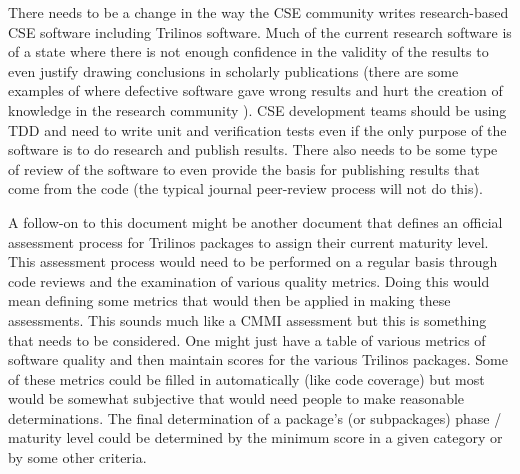 \documentclass[11pt]{SANDreport}
\begin{document}
There needs to be a change in the way the CSE community writes
research-based CSE software including Trilinos software.  Much of the
current research software is of a state where there is not enough
confidence in the validity of the results to even justify drawing
conclusions in scholarly publications (there are some examples of
where defective software gave wrong results and hurt the creation of
knowledge in the research community
{}\cite{ScientistsNightmareFiveRetractions2006}).  CSE development
teams should be using TDD and need to write unit and verification
tests even if the only purpose of the software is to do research and
publish results.  There also needs to be some type of review of the
software to even provide the basis for publishing results that come
from the code (the typical journal peer-review process will not do
this).

A follow-on to this document might be another document that defines an
official assessment process for Trilinos packages to assign their
current maturity level.  This assessment process would need to be
performed on a regular basis through code reviews and the examination
of various quality metrics.  Doing this would mean defining some
metrics that would then be applied in making these assessments. This
sounds much like a CMMI assessment but this is something that needs to
be considered.  One might just have a table of various metrics of
software quality and then maintain scores for the various Trilinos
packages.  Some of these metrics could be filled in automatically
(like code coverage) but most would be somewhat subjective that would
need people to make reasonable determinations.  The final
determination of a package's (or subpackages) phase / maturity level
could be determined by the minimum score in a given category or by
some other criteria.
\end{document}
